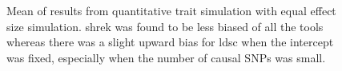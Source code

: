 \begin{figure}
{				
				\label{fig:ldscInQtEqualMean}
			}
			\caption[Quantitative Trait with Equal Effect Size Simulation Result(Mean)]
			{Mean of results from quantitative trait simulation with equal effect size simulation.
				\gls{shrek} was found to be less biased of all the tools whereas there was a slight upward bias for \gls{ldsc} when the intercept was fixed, especially when the number of causal \glspl{SNP} was small.} 
			\label{fig:QtEqualMean}
		\end{figure}
		
